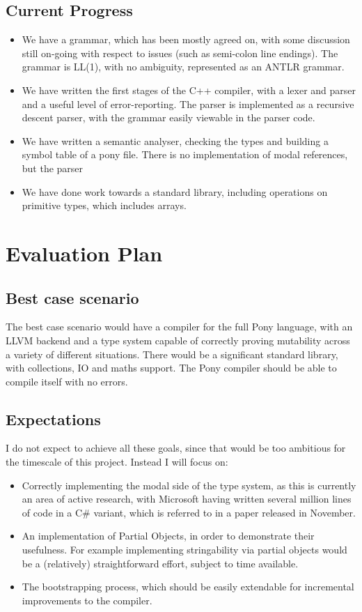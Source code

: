 \documentclass[pdftex,11pt,a4paper]{report}
\begin{document}
\section{Current Progress}

\begin{itemize}
\item We have a grammar, which has been mostly agreed on, with some discussion still on-going with respect to issues (such as semi-colon line endings).
	The grammar is LL(1), with no ambiguity, represented as an ANTLR grammar. 
\item We have written the first stages of the C++ compiler, with a lexer and parser and a useful level of error-reporting.
	The parser is implemented as a recursive descent parser, with the grammar easily viewable in the parser code.
\item We have written a semantic analyser, checking the types and building a symbol table of a pony file.
	There is no implementation of modal references, but the parser 
\item We have done work towards a standard library, including operations on primitive types, which includes arrays.
\end{itemize}

\newpage
\chapter{Evaluation Plan}

\section{Best case scenario}

The best case scenario would have a compiler for the full Pony language, with an LLVM backend and a type system capable of correctly proving mutability across a variety of different situations.
There would be a significant standard library, with collections, IO and maths support.
The Pony compiler should be able to compile itself with no errors.

\section{Expectations}

I do not expect to achieve all these goals, since that would be too ambitious for the timescale of this project.
Instead I will focus on:
\begin{itemize}
\item Correctly implementing the modal side of the type system, as	this is currently an area of active research, with Microsoft having written several million lines of code in a C\# variant, which is referred to in a paper released in November\cite{microsoft2012}.
\item An implementation of Partial Objects, in order to demonstrate their usefulness.
	For example implementing stringability via partial objects would be a (relatively) straightforward effort, subject to time available.
\item The bootstrapping process, which should be easily extendable for incremental improvements to the compiler.
\end{itemize}
\end{document}
